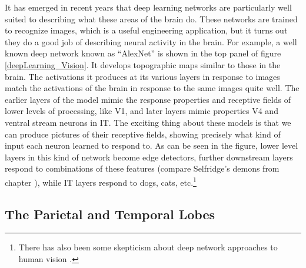 It has emerged in recent years that deep learning networks are particularly well suited to describing what these areas of the brain do. These networks are trained to recognize images, which is a useful engineering application, but it turns out they do a good job of describing neural activity in the brain. For example, a well known deep network known as ``AlexNet'' \cite{krizhevsky2012imagenet} is shown in the top panel of figure \ref{deepLearning_Vision}. It develops topographic maps similar to those in the brain. The activations it produces at its various layers in response to images match the activations of the brain in response to the same images quite well. The earlier layers of the model mimic the response properties and receptive fields of lower levels of processing, like V1, and later layers mimic properties V4 and ventral stream neurons in IT. The exciting thing about these models is that we can produce pictures of their receptive fields, showing precisely what kind of input each neuron learned to respond to. As can be seen in the figure, lower level layers in this kind of network become edge detectors, further downstream layers respond to combinations of these features (compare Selfridge's demons from chapter ), while IT layers respond to dogs, cats, etc.\footnote{There has also been some skepticism about deep network approaches to human vision \cite{bowers2022deep}.}

\subsection{The Parietal and Temporal Lobes}


